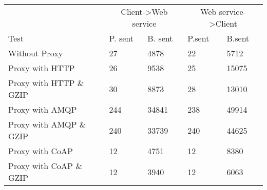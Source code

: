 \begin{tabularx}{\textwidth}{lXXXX}
\hline
\multicolumn{1}{l}{}                  & \multicolumn{2}{c}{Client->Web service}                           & \multicolumn{2}{c}{Web service->Client}                           \\
\multicolumn{1}{l}{Test} & \multicolumn{1}{l}{P. sent} & \multicolumn{1}{l}{B. sent} & \multicolumn{1}{l}{P.sent} & \multicolumn{1}{l}{B.sent} \\ \hline
Without Proxy                   & 27             & 4878           & 22             & 5712           \\
Proxy with HTTP                 & 26             & 9538           & 25             & 15075          \\
Proxy with HTTP \& GZIP         & 30             & 8873           & 28             & 13010          \\
Proxy with AMQP                 & 244            & 34841          & 238            & 49914          \\
Proxy with AMQP \& GZIP         & 240            & 33739          & 240            & 44625          \\
Proxy with CoAP                 & 12             & 4751           & 12             & 8380           \\
Proxy with CoAP \& GZIP         & 12             & 3940           & 12             & 6063           \\
\end{tabularx}
